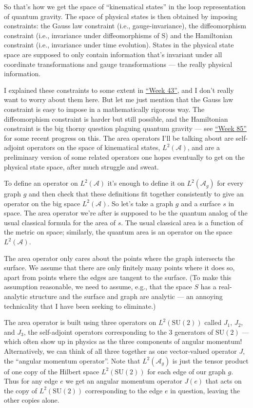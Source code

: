 \documentclass{article}
\begin{document}
\begin{itemize}
  So that's how we get the space of ``kinematical states'' in the loop
  representation of quantum gravity. The space of physical states is
  then obtained by imposing constraints: the Gauss law constraint (i.e.,
  gauge-invariance), the diffeomorphism constraint (i.e., invariance
  under diffeomorphisms of S) and the Hamiltonian constraint (i.e.,
  invariance under time evolution). States in the physical state space
  are supposed to only contain information that's invariant under all
  coordinate transformations and gauge transformations --- the really
  physical information.

  I explained these constraints to some extent in
  \protect\hyperlink{week43}{``Week 43''}, and I don't really want to
  worry about them here. But let me just mention that the Gauss law
  constraint is easy to impose in a mathematically rigorous way. The
  diffeomorphism constraint is harder but still possible, and the
  Hamiltonian constraint is the big thorny question plaguing quantum
  gravity --- see \protect\hyperlink{week85}{``Week 85''} for some
  recent progress on this. The area operators I'll be talking about are
  self-adjoint operators on the space of kinematical states,
  \(L^2(\mathcal{A})\), and are a preliminary version of some related
  operators one hopes eventually to get on the physical state space,
  after much struggle and sweat.

  To define an operator on \(L^2(\mathcal{A})\) it's enough to define it
  on \(L^2(\mathcal{A}_g)\) for every graph \(g\) and then check that
  these definitions fit together consistently to give an operator on the
  big space \(L^2(\mathcal{A})\). So let's take a graph \(g\) and a
  surface \(s\) in space. The area operator we're after is supposed to
  be the quantum analog of the usual classical formula for the area of
  \(s\). The usual classical area is a function of the metric on space;
  similarly, the quantum area is an operator on the space
  \(L^2(\mathcal{A})\).

  The area operator only cares about the points where the graph
  intersects the surface. We assume that there are only finitely many
  points where it does so, apart from points where the edges are tangent
  to the surface. (To make this assumption reasonable, we need to
  assume, e.g., that the space \(S\) has a real-analytic structure and
  the surface and graph are analytic --- an annoying technicality that I
  have been seeking to eliminate.)

  The area operator is built using three operators on
  \(L^2(\mathrm{SU}(2))\) called \(J_1\), \(J_2\), and \(J_3\), the
  self-adjoint operators corresponding to the 3 generators of
  \(\mathrm{SU}(2)\) --- which often show up in physics as the three
  components of angular momentum! Alternatively, we can think of all
  three together as one vector-valued operator \(J\), the ``angular
  momentum operator''. Note that \(L^2(\mathcal{A}_g)\) is just the
  tensor product of one copy of the Hilbert space
  \(L^2(\mathrm{SU}(2))\) for each edge of our graph \(g\). Thus for any
  edge \(e\) we get an angular momentum operator \(J(e)\) that acts on
  the copy of \(L^2(\mathrm{SU}(2))\) corresponding to the edge \(e\) in
  question, leaving the other copies alone.


\end{itemize}
\end{document}
